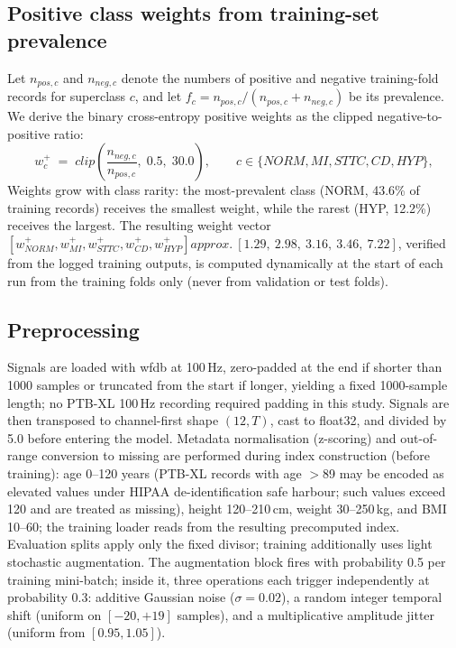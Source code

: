\documentclass[mathematics,article,submit,pdftex]{Definitions/mdpi}
\def\texttt#1{#1}%
\def\mathrm#1{#1}%
\def\approx{approx.\ }%
\begin{document}
\subsection{Positive class weights from training-set prevalence}
Let $n_{\mathrm{pos},c}$ and $n_{\mathrm{neg},c}$ denote the numbers of positive and negative training-fold records for superclass $c$, and let $f_c = n_{\mathrm{pos},c}/(n_{\mathrm{pos},c}+n_{\mathrm{neg},c})$ be its prevalence. We derive the binary cross-entropy positive weights as the clipped negative-to-positive ratio:
\begin{equation}\label{eq:posweights}
w_c^{+} \;=\; \mathrm{clip}\!\left(\frac{n_{\mathrm{neg},c}}{n_{\mathrm{pos},c}},\;0.5,\;30.0\right), \qquad c\in\{\mathrm{NORM},\mathrm{MI},\mathrm{STTC},\mathrm{CD},\mathrm{HYP}\},
\end{equation}
Weights grow with class rarity: the most-prevalent class (NORM, 43.6\% of training records) receives the smallest weight, while the rarest (HYP, 12.2\%) receives the largest. The resulting weight vector $[w_{\mathrm{NORM}}^+, w_{\mathrm{MI}}^+, w_{\mathrm{STTC}}^+, w_{\mathrm{CD}}^+, w_{\mathrm{HYP}}^+] \approx [1.29,\ 2.98,\ 3.16,\ 3.46,\ 7.22]$, verified from the logged training outputs, is computed dynamically at the start of each run from the training folds only (never from validation or test folds).

\subsection{Preprocessing}
Signals are loaded with \texttt{wfdb} at 100\,Hz, zero-padded at the end if shorter than 1000 samples or truncated from the start if longer, yielding a fixed 1000-sample length; no PTB-XL 100\,Hz recording required padding in this study. Signals are then transposed to channel-first shape $(12,T)$, cast to \texttt{float32}, and divided by 5.0 before entering the model. Metadata normalisation (z-scoring) and out-of-range conversion to missing are performed during index construction (before training): age 0--120 years (PTB-XL records with age $>$89 may be encoded as elevated values under HIPAA de-identification safe harbour; such values exceed 120 and are treated as missing), height 120--210\,cm, weight 30--250\,kg, and BMI 10--60; the training loader reads from the resulting precomputed index. Evaluation splits apply only the fixed divisor; training additionally uses light stochastic augmentation. The augmentation block fires with probability 0.5 per training mini-batch; inside it, three operations each trigger independently at probability 0.3: additive Gaussian noise ($\sigma{=}0.02$), a random integer temporal shift (uniform on $[-20,+19]$ samples), and a multiplicative amplitude jitter (uniform from $[0.95, 1.05]$).
\end{document}
